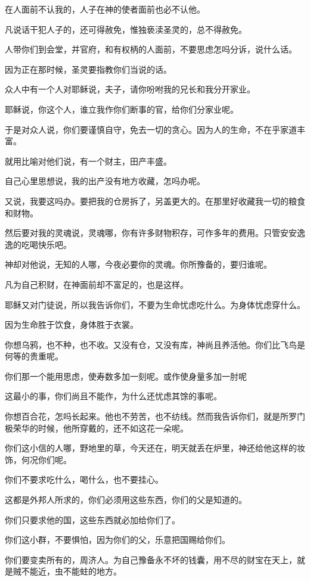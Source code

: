 \documentclass[12pt,oneside]{book}
\begin{document}
在人面前不认我的，人子在神的使者面前也必不认他。

凡说话干犯人子的，还可得赦免，惟独亵渎圣灵的，总不得赦免。

人带你们到会堂，并官府，和有权柄的人面前，不要思虑怎吗分诉，说什么话。

因为正在那时候，圣灵要指教你们当说的话。

众人中有一个人对耶稣说，夫子，请你吩咐我的兄长和我分开家业。

耶稣说，你这个人，谁立我作你们断事的官，给你们分家业呢。

于是对众人说，你们要谨慎自守，免去一切的贪心。因为人的生命，不在乎家道丰富。

就用比喻对他们说，有一个财主，田产丰盛。

自己心里思想说，我的出产没有地方收藏，怎吗办呢。

又说，我要这吗办。要把我的仓房拆了，另盖更大的。在那里好收藏我一切的粮食和财物。

然后要对我的灵魂说，灵魂哪，你有许多财物积存，可作多年的费用。只管安安逸逸的吃喝快乐吧。

神却对他说，无知的人哪，今夜必要你的灵魂。你所豫备的，要归谁呢。

凡为自己积财，在神面前却不富足的，也是这样。

耶稣又对门徒说，所以我告诉你们，不要为生命忧虑吃什么。为身体忧虑穿什么。

因为生命胜于饮食，身体胜于衣裳。

你想乌鸦，也不种，也不收。又没有仓，又没有库，神尚且养活他。你们比飞鸟是何等的贵重呢。

你们那一个能用思虑，使寿数多加一刻呢。或作使身量多加一肘呢

这最小的事，你们尚且不能作，为什么还忧虑其馀的事呢。

你想百合花，怎吗长起来。他也不劳苦，也不纺线。然而我告诉你们，就是所罗门极荣华的时候，他所穿戴的，还不如这花一朵呢。

你们这小信的人哪，野地里的草，今天还在，明天就丢在炉里，神还给他这样的妆饰，何况你们呢。

你们不要求吃什么，喝什么，也不要挂心。

这都是外邦人所求的，你们必须用这些东西，你们的父是知道的。

你们只要求他的国，这些东西就必加给你们了。

你们这小群，不要惧怕，因为你们的父，乐意把国赐给你们。

你们要变卖所有的，周济人。为自己豫备永不坏的钱囊，用不尽的财宝在天上，就是贼不能近，虫不能蛀的地方。
\end{document}
